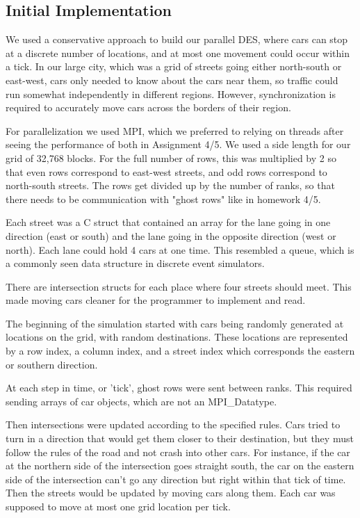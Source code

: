 \documentclass[11pt,a4paper]{article}
\begin{document}
\subsection{Initial Implementation}

We used a conservative approach to build our parallel DES, where cars can stop at a discrete number of locations, and at most one movement could occur within a tick. In our large city, which was a grid of streets going either north-south or east-west, cars only needed to know about the cars near them, so traffic could run somewhat independently in different regions. However, synchronization is required to accurately move cars across the borders of their region.

For parallelization we used MPI, which we preferred to relying on threads after seeing the performance of both in Assignment 4/5. We used a side length for our grid of 32,768 blocks. For the full number of rows, this was multiplied by 2 so that even rows correspond to east-west streets, and odd rows correspond to north-south streets. The rows get divided up by the number of ranks, so that there needs to be communication with "ghost rows" like in homework 4/5.

Each street was a C struct that contained an array for the lane going in one direction (east or south) and the lane going in the opposite direction (west or north). Each lane could hold 4 cars at one time. This resembled a queue, which is a commonly seen data structure in discrete event simulators.

There are intersection structs for each place where four streets should meet. This made moving cars cleaner for the programmer to implement and read.

The beginning of the simulation started with cars being randomly generated at locations on the grid, with random destinations. These locations are represented by a row index, a column index, and a street index which corresponds the eastern or southern direction.

At each step in time, or 'tick', ghost rows were sent between ranks. This required sending arrays of car objects, which are not an MPI\_Datatype.

Then intersections were updated according to the specified rules. Cars tried to turn in a direction that would get them closer to their destination, but they must follow the rules of the road and not crash into other cars. For instance, if the car at the northern side of the intersection goes straight south, the car on the eastern side of the intersection can't go any direction but right within that tick of time. Then the streets would be updated by moving cars along them. Each car was supposed to move at most one grid location per tick.
\end{document}

